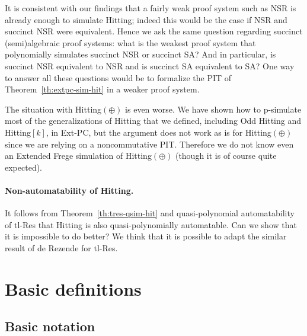 \documentclass[11pt]{article}
\newcommand{\scterm}[1]{{\textrm{\sc #1}}}
\newcommand{\hit}{\scterm{Hitting}}
\newcommand{\tres}{\scterm{tl-Res}}
\newcommand{\F}{\scterm{Frege}}
\newcommand{\EF}{\scterm{Extended {\F}}}
\newcommand{\extpc}{\scterm{Ext-PC}}
\newcommand{\nsr}{\scterm{NSR}}
\newcommand{\sa}{\scterm{SA}}
\newcommand{\hitp}{{\hit}$(\oplus)$}
\newcommand{\hitodd}{\scterm{Odd} {\hit}}
\newcommand{\hitk}[1]{\hit$[#1]$}
\newcommand{\TODOJ}[1]{}%
\numberwithin{equation}{section}
\begin{document}
It is consistent with our findings that a fairly weak proof system such as {\nsr} is already enough to simulate {\hit}; indeed this would be the case if {\nsr} and succinct {\nsr} were equivalent. Hence we ask the same question regarding succinct (semi)algebraic proof systems: what is the weakest proof system that polynomially simulates succinct {\nsr} or succinct {\sa}? And in particular, is succinct {\nsr} equivalent to {\nsr} and is succinct {\sa} equivalent to {\sa}? One way to answer all these questions would be to formalize the PIT of Theorem~\ref{th:extpc-sim-hit} in a weaker proof system.


The situation with {\hitp} is even worse. We have shown how to p-simulate most of the generalizations of {\hit} that we defined, including {\hitodd} and {\hitk{k}}, in {\extpc}, but the argument does not work as is for {\hitp} since we are relying on a noncommutative PIT. Therefore we do not know even an {\EF} simulation of {\hitp} (though it is of course quite expected). %

\paragraph{Non-automatability of {\hit}.} It follows from Theorem~\ref{th:tres-qsim-hit} and quasi-polynomial automatability of {\tres} \cite{BP96} that {\hit} is also quasi-polynomially automatable. Can we show that it is impossible to do better? We think that it is possible to adapt the similar result of de Rezende \cite{dR21} for {\tres}.


\section{Basic definitions}
\subsection{Basic notation}
\end{document}
